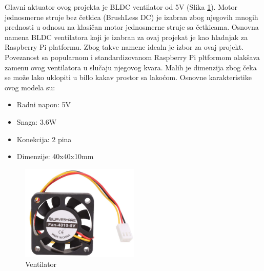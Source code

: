 \documentclass[a4paper, 12pt]{article}
\begin{document}
	\vspace{10pt}
	
\begingroup
	
	Glavni aktuator ovog projekta je BLDC ventilator od 5V (Slika \ref{ref:DC40mm5V}). Motor jednosmerne struje bez četkica (BrushLess DC) je izabran zbog njegovih mnogih prednosti u odnosu na klasičan motor jednosmerne struje sa četkicama. Osnovna namena BLDC ventilatora koji je izabran za ovaj projekat je kao hladnjak za Raspberry Pi platformu. Zbog takve namene idealn je izbor za ovaj projekt. Povezanost sa popularnom i standardizovanom Raspberry Pi pltformom olakšava zamenu ovog ventilatora u slučaju njegovog kvara.  Malih je dimenzija zbog čeka se može lako uklopiti u billo kakav prostor sa lakoćom. Osnovne karakteristike ovog modela su: 
	

\begin{itemize}
	\item Radni napon: 5V
	\item Snaga: 3.6W
	\item Konekcija: 2 pina
	\item Dimenzije: 40x40x10mm
\end{itemize}

\begin{figure}
\centering
\includegraphics[width=0.5\textwidth]{images/DC40mm5V} 
\caption{Ventilator} \label{ref:DC40mm5V}
\end{figure}
\end{document}
